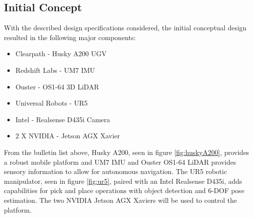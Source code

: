 \subsection{Initial Concept}
With the described design specifications considered, the initial conceptual design resulted in the following major components:

\begin{itemize}
    \item Clearpath - Husky A200 UGV
    \item Redshift Labs - UM7 IMU
    \item Ouster -  OS1-64 3D LiDAR
    \item Universal Robots - UR5
    \item Intel - Realsense D435i Camera
    \item 2 X NVIDIA - Jetson AGX Xavier
\end{itemize}

From the bulletin list above, Husky A200, seen in figure \ref{fig:huskyA200}, provides a robust mobile platform and UM7 IMU and Ouster OS1-64 LiDAR provides sensory information to allow for autonomous navigation. The UR5 robotic manipulator, seen in figure \ref{fig:ur5}, paired with an Intel Realsense D435i, adds capabilities for pick and place operations with object detection and 6-DOF pose estimation. The two NVIDIA Jetson AGX Xaviers will be used to control the platform.

